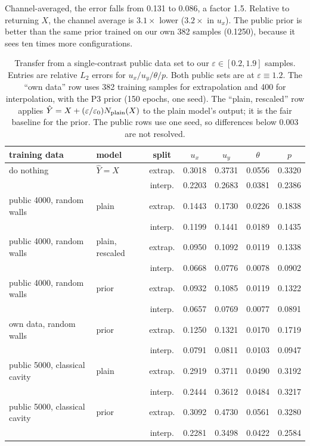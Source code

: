 \documentclass[preprint,11pt,a4paper,times,doubleblind]{elsarticle}
\begin{document}
Channel-averaged, the error falls from 0.131 to 0.086, a factor 1.5. Relative to returning
$X$, the channel average is $3.1\times$ lower ($3.2\times$ in $u_x$). The public prior is
better than the same prior trained on our own 382 samples (0.1250), because it sees ten times
more configurations.

\begin{table}[htbp]
\centering
\caption{Transfer from a single-contrast public data set to our
$\varepsilon\in[0.2,1.9]$ samples. Entries are relative $L_2$ errors for
$u_x/u_y/\theta/p$. Both public sets are at $\varepsilon\equiv1.2$. The ``own data'' row uses
382 training samples for extrapolation and 400 for interpolation, with the P3 prior (150
epochs, one seed). The ``plain, rescaled'' row applies
$\hat Y=X+(\varepsilon/\varepsilon_0)N_{\rm plain}(X)$ to the plain model's output; it is the
fair baseline for the prior. The public rows use one seed, so differences below 0.003 are not
resolved.}
\label{tab:transfer}
\small
\setlength{\tabcolsep}{4pt}
\begin{tabular}{@{}llccccc@{}}
\toprule
training data & model & split & $u_x$ & $u_y$ & $\theta$ & $p$\\
\midrule
do nothing & $\hat Y=X$ & extrap. & 0.3018 & 0.3731 & 0.0556 & 0.3320\\
 &  & interp. & 0.2203 & 0.2683 & 0.0381 & 0.2386\\
public 4000, random walls & plain & extrap. & 0.1443 & 0.1730 & 0.0226 & 0.1838\\
 &  & interp. & 0.1199 & 0.1441 & 0.0189 & 0.1435\\
public 4000, random walls & plain, rescaled & extrap. & 0.0950 & 0.1092 & 0.0119 & 0.1338\\
 &  & interp. & 0.0668 & 0.0776 & 0.0078 & 0.0902\\
public 4000, random walls & prior & extrap. & 0.0932 & 0.1085 & 0.0119 & 0.1322\\
 &  & interp. & 0.0657 & 0.0769 & 0.0077 & 0.0891\\
own data, random walls & prior & extrap. & 0.1250 & 0.1321 & 0.0170 & 0.1719\\
 &  & interp. & 0.0791 & 0.0811 & 0.0103 & 0.0947\\
public 5000, classical cavity & plain & extrap. & 0.2919 & 0.3711 & 0.0490 & 0.3192\\
 &  & interp. & 0.2444 & 0.3612 & 0.0484 & 0.3217\\
public 5000, classical cavity & prior & extrap. & 0.3092 & 0.4730 & 0.0561 & 0.3280\\
 &  & interp. & 0.2281 & 0.3498 & 0.0422 & 0.2584\\
\bottomrule
\end{tabular}
\end{table}
\end{document}
